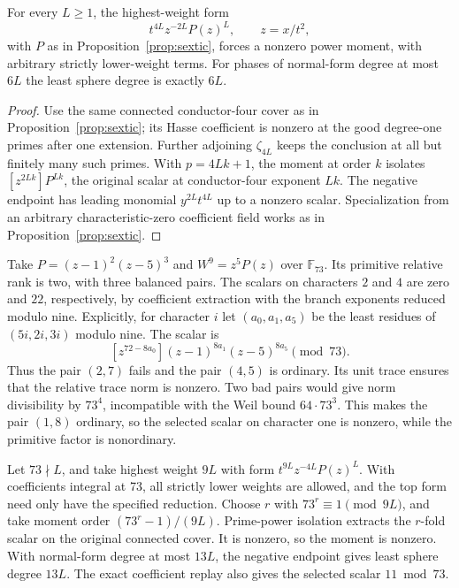 \begin{proposition}\label{prop:scaled}
For every \(L\ge1\), the highest-weight form
\[
       t^{4L} z^{-2L}P(z)^L,\qquad z=x/t^2 ,
\]
with \(P\) as in Proposition~\ref{prop:sextic}, forces a nonzero
power moment, with arbitrary strictly lower-weight terms.
For phases of normal-form degree at most \(6L\) the least sphere
degree is exactly \(6L\).
\end{proposition}

\begin{proof}
Use the same connected conductor-four cover as in
Proposition~\ref{prop:sextic}; its Hasse coefficient is nonzero at
the good degree-one primes after one extension. Further adjoining
\(\zeta_{4L}\) keeps the conclusion at all but finitely many such
primes. With \(p=4Lk+1\), the moment at order \(k\) isolates
\([z^{2Lk}]P^{Lk}\), the original scalar at conductor-four
exponent \(Lk\). The negative endpoint has leading monomial
\(y^{2L}t^{4L}\) up to a nonzero scalar. Specialization from an
arbitrary characteristic-zero coefficient field works as in
Proposition~\ref{prop:sextic}.
\end{proof}

\begin{example}
Take \(P=(z-1)^2(z-5)^3\) and \(W^9=z^5P(z)\) over
\(\mathbb F_{73}\). Its primitive relative rank is two, with
three balanced pairs. The scalars on characters \(2\) and \(4\)
are zero and \(22\), respectively, by coefficient extraction
with the branch exponents reduced modulo nine. Explicitly, for
character \(i\) let \((a_0,a_1,a_5)\) be the least residues of
\((5i,2i,3i)\) modulo nine. The scalar is
\[
       [z^{72-8a_0}](z-1)^{8a_1}(z-5)^{8a_5}\pmod {73}.
\]
Thus the pair
\((2,7)\) fails and the pair \((4,5)\) is ordinary. Its unit
trace ensures that the relative trace norm is nonzero.
Two bad pairs would give norm divisibility by \(73^4\),
incompatible with the Weil bound \(64\cdot73^3\). This makes
the pair \((1,8)\) ordinary, so the selected scalar on character
one is nonzero, while the primitive factor is nonordinary.

Let \(73\nmid L\), and take highest weight \(9L\) with form
\(t^{9L}z^{-4L}P(z)^L\). With coefficients integral at 73,
all strictly lower weights are allowed, and the top form need
only have the specified reduction. Choose \(r\) with
\(73^r\equiv1\pmod {9L}\), and take moment order
\((73^r-1)/(9L)\). Prime-power isolation extracts the
\(r\)-fold scalar on the original connected cover.
It is nonzero, so the moment is nonzero. With normal-form
degree at most \(13L\), the negative endpoint gives
least sphere degree \(13L\). The exact coefficient
replay also gives the selected scalar \(11\bmod73\).
\end{example}

